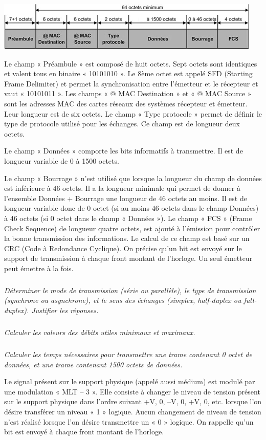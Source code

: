 \documentclass[10pt]{article}
\begin{document}
\begin{center}
\includegraphics[width=.8\textwidth]{images/im_01}
\end{center}


Le champ « Préambule » est composé de huit octets. Sept octets sont identiques et valent tous en binaire « 10101010 ». Le 8ème octet est appelé SFD (Starting Frame Delimiter) et permet la synchronisation entre l'émetteur et le récepteur et vaut « 10101011 ».
Les champs « @ MAC Destination » et « @ MAC Source » sont les adresses MAC des cartes réseaux des systèmes récepteur et émetteur. Leur longueur est de six octets.
Le champ « Type protocole » permet de définir le type de protocole utilisé pour les échanges. Ce champ est de longueur deux octets.

Le champ « Données » comporte les bits informatifs à transmettre. Il est de longueur variable de 0 à 1500 octets.

Le champ « Bourrage » n'est utilisé que lorsque la longueur du champ de données est inférieure à 46 octets. Il a la longueur minimale qui permet de donner à l'ensemble Données + Bourrage une longueur de 46 octets au moins. Il est de longueur variable donc de 0 octet (si au moins 46 octets dans le champ Données) à 46 octets (si 0 octet dans le champ « Données »).
Le champ « FCS » (Frame Check Sequence) de longueur quatre octets, est ajouté à l'émission pour contrôler la bonne transmission des informations. Le calcul de ce champ est basé sur un CRC (Code à Redondance Cyclique). On précise qu'un bit est envoyé sur le support de transmission à chaque front montant de l'horloge. Un seul émetteur peut émettre à la fois.

\subparagraph{}
\textit{Déterminer le mode de transmission (série ou parallèle), le type de transmission (synchrone ou asynchrone), et le sens des échanges (simplex, half-duplex ou full-duplex). Justifier les réponses.}

\subparagraph{}
\textit{Calculer les valeurs des débits utiles minimaux et maximaux.}

\subparagraph{}
\textit{Calculer les temps nécessaires pour transmettre une trame contenant 0 octet de données, et une trame contenant 1500 octets de données.}

Le signal présent sur le support physique (appelé aussi médium) est modulé par une modulation « MLT – 3 ». Elle consiste à changer le niveau de tension présent sur le support physique dans l'ordre suivant +V, 0, –V, 0, +V, 0, etc. lorsque l'on désire transférer un niveau « 1 » logique. Aucun changement de niveau de tension n'est réalisé lorsque l'on désire transmettre un « 0 » logique. On rappelle qu'un bit est envoyé à chaque front montant de l'horloge.
\end{document}
